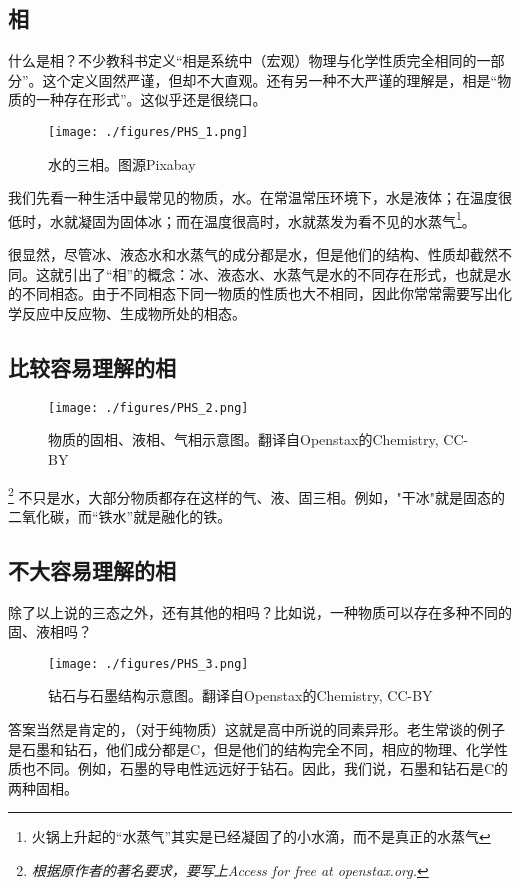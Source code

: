 
\subsection{相}
什么是相？不少教科书定义“相是系统中（宏观）物理与化学性质完全相同的一部分”。这个定义固然严谨，但却不大直观。还有另一种不大严谨的理解是，相是“物质的一种存在形式”。这似乎还是很绕口。

\begin{figure}[ht]
\centering
\texttt{[image: ./figures/PHS\_1.png]}
\caption{水的三相。图源Pixabay} \label{PHS_fig1}
\end{figure}
我们先看一种生活中最常见的物质，水。在常温常压环境下，水是液体；在温度很低时，水就凝固为固体冰；而在温度很高时，水就蒸发为看不见的水蒸气\footnote{火锅上升起的“水蒸气”其实是已经凝固了的小水滴，而不是真正的水蒸气}。

很显然，尽管冰、液态水和水蒸气的成分都是水，但是他们的结构、性质却截然不同。这就引出了“相”的概念：冰、液态水、水蒸气是水的不同存在形式，也就是水的不同相态。由于不同相态下同一物质的性质也大不相同，因此你常常需要写出化学反应中反应物、生成物所处的相态。

\subsection{比较容易理解的相}
\begin{figure}[ht]
\centering
\texttt{[image: ./figures/PHS\_2.png]}
\caption{物质的固相、液相、气相示意图。翻译自Openstax的Chemistry, CC-BY} \label{PHS_fig2}
\end{figure}
\footnote{\textsl{根据原作者的著名要求，要写上Access for free at openstax.org.}}
不只是水，大部分物质都存在这样的气、液、固三相。例如，"干冰"就是固态的二氧化碳，而“铁水”就是融化的铁。

\subsection{不大容易理解的相}
除了以上说的三态之外，还有其他的相吗？比如说，一种物质可以存在多种不同的固、液相吗？

\begin{figure}[ht]
\centering
\texttt{[image: ./figures/PHS\_3.png]}
\caption{钻石与石墨结构示意图。翻译自Openstax的Chemistry, CC-BY} \label{PHS_fig3}
\end{figure}
答案当然是肯定的，（对于纯物质）这就是高中所说的同素异形。老生常谈的例子是石墨和钻石，他们成分都是C，但是他们的结构完全不同，相应的物理、化学性质也不同。例如，石墨的导电性远远好于钻石。因此，我们说，石墨和钻石是C的两种固相。

